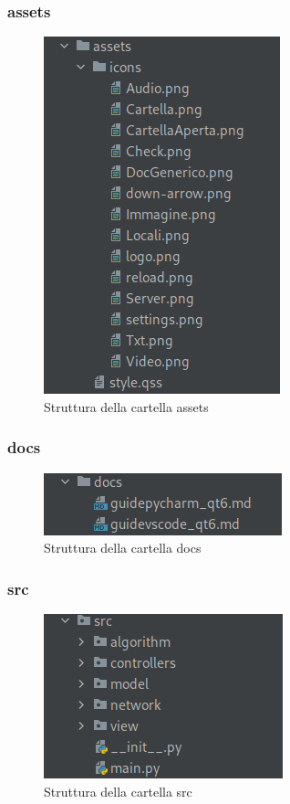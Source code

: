 \subsubsection{assets}    
\begin{figure}[H]
    \centering
    \includegraphics[scale = 0.5]{components/img/struttura-cartella-assets.png}
    \caption{Struttura della cartella assets}
    \label{fig:Struttura della cartella assets}
\end{figure}   
\subsubsection{docs}    
\begin{figure}[H]
    \centering
    \includegraphics[scale = 0.5]{components/img/struttura-cartella-docs.png}
    \caption{Struttura della cartella docs}
    \label{fig:Struttura della cartella docs}
\end{figure}    
\subsubsection{src}    
\begin{figure}[H]
    \centering
    \includegraphics[scale = 0.5]{components/img/struttura-cartella-src.png}
    \caption{Struttura della cartella src}
    \label{fig:Struttura della cartella src}
\end{figure}    
